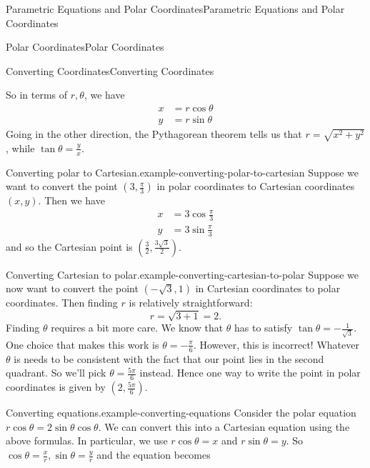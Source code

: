 \documentclass[10pt,]{book}
\numberwithin{equation}{section}
\begin{document}
\begin{chapterptx}{Parametric Equations and Polar Coordinates}{}{Parametric Equations and Polar Coordinates}{}{}
\begin{sectionptx}{Polar Coordinates}{}{Polar Coordinates}{}{}
\begin{subsectionptx}{Converting Coordinates}{}{Converting Coordinates}{}{}
\begin{figure}
{\begin{tikzpicture}
\end{tikzpicture}
}
\end{figure}
\hypertarget{p-803}{}%
So in terms of \(r,\theta\), we have%
%
\begin{align*}
x & = r\cos\theta \\
y & = r\sin\theta 
\end{align*}
\hypertarget{p-804}{}%
Going in the other direction, the Pythagorean theorem tells us that \(r = \sqrt{x^{2}+y^{2}}\), while \(\tan\theta = \frac{y}{x}\).%
\begin{example}{Converting polar to Cartesian.}{example-converting-polar-to-cartesian}%
\hypertarget{p-805}{}%
Suppose we want to convert the point \((3,\frac{\pi}{3})\) in polar coordinates to Cartesian coordinates \((x,y)\). Then we have%
%
\begin{align*}
x & = 3\cos\frac{\pi}{3} \\
y & = 3\sin\frac{\pi}{3} 
\end{align*}
\hypertarget{p-806}{}%
and so the Cartesian point is \((\frac{3}{2},\frac{3\sqrt{3}}{2}).\)%
\end{example}
\begin{example}{Converting Cartesian to polar.}{example-converting-cartesian-to-polar}%
\hypertarget{p-807}{}%
Suppose we now want to convert the point \((-\sqrt{3},1)\) in Cartesian coordinates to polar coordinates. Then finding \(r\) is relatively straightforward:%
%
\begin{equation*}
r = \sqrt{3+1} = 2.
\end{equation*}
\hypertarget{p-808}{}%
Finding \(\theta\) requires a bit more care. We know that \(\theta\) has to satisfy \(\tan\theta = -\frac{1}{\sqrt{3}}\). One choice that makes this work is \(\theta = -\frac{\pi}{6}\). However, this is incorrect! Whatever \(\theta\) is needs to be consistent with the fact that our point lies in the second quadrant. So we'll pick \(\theta = \frac{5\pi}{6}\) instead. Hence one way to write the point in polar coordinates is given by \((2,\frac{5\pi}{6}).\)%
\end{example}
\begin{example}{Converting equations.}{example-converting-equations}%
\hypertarget{p-809}{}%
Consider the polar equation \(r\cos\theta = 2\sin\theta\cos\theta\). We can convert this into a Cartesian equation using the above formulas. In particular, we use \(r\cos\theta = x\) and \(r\sin\theta = y\). So \(\cos\theta = \frac{x}{r}, \sin\theta = \frac{y}{r}\) and the equation becomes%
%
\begin{equation*}

\end{equation*}
\end{example}
\end{subsectionptx}
\end{sectionptx}
\end{chapterptx}
\end{document}
